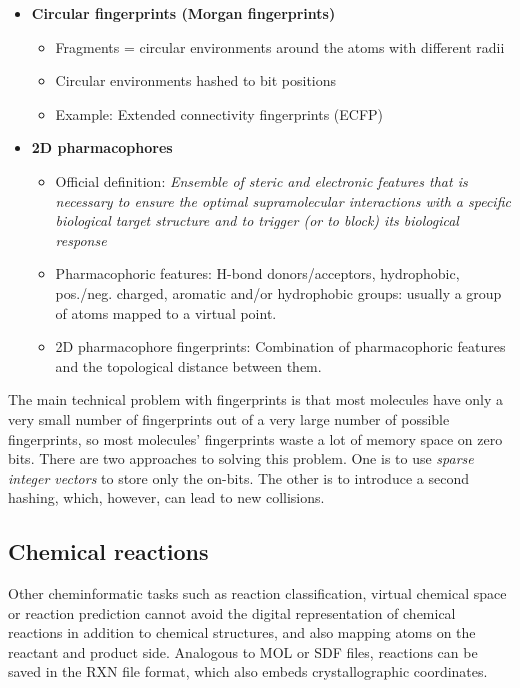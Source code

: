 \begin{itemize}
    \item \textbf{Circular fingerprints (Morgan fingerprints)}
    \begin{itemize}
        \item Fragments = circular environments around the atoms with different radii
        \item Circular environments hashed to bit positions
        \item Example: Extended connectivity fingerprints (ECFP)
    \end{itemize}
    \begin{center}\includegraphics[width=0.85\textwidth{img/cheminformatics/FingerprintsCircular.png}\end{center}
    \item \textbf{2D pharmacophores}
    \begin{itemize}
        \item Official definition: \emph{Ensemble of steric and electronic features that is necessary to ensure the optimal supramolecular interactions with a specific biological target structure and to trigger (or to block) its biological response}
        \item Pharmacophoric features: H-bond donors/acceptors, hydrophobic, pos./neg. charged, aromatic and/or hydrophobic groups: usually a group of atoms mapped to a virtual point.
        \item 2D pharmacophore fingerprints: Combination of pharmacophoric features and the topological distance between them.
    \end{itemize}
\end{itemize}

The main technical problem with fingerprints is that most molecules have only a very small number of fingerprints out of a very large number of possible fingerprints, so most molecules' fingerprints waste a lot of memory space on zero bits. There are two approaches to solving this problem. One is to use \emph{sparse integer vectors} to store only the on-bits. The other is to introduce a second hashing, which, however, can lead to new collisions.

\subsection{Chemical reactions}

Other cheminformatic tasks such as reaction classification, virtual chemical space or reaction prediction cannot avoid the digital representation of chemical reactions in addition to chemical structures, and also mapping atoms on the reactant and product side. Analogous to MOL or SDF files, reactions can be saved in the RXN file format, which also embeds crystallographic coordinates.

